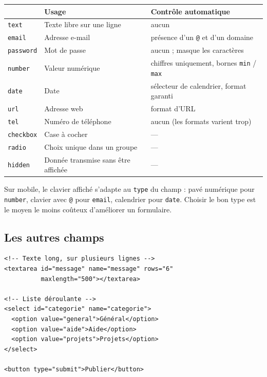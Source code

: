 \documentclass[a4paper,11pt]{article}
\newcommand{\hdr}[1]{\multicolumn{1}{l}{\color{white}\bfseries #1}}
\renewcommand{\arraystretch}{1.3}
\begin{document}
\begin{center}
\renewcommand{\arraystretch}{1.0}
\begin{tabularx}{\linewidth}{p{2.5cm}Xp{3.5cm}}
  \toprule
  \rowcolor{uniNavy}
  \hdr{\texttt{type}} & \hdr{Usage} & \hdr{Contrôle automatique} \\
  \midrule
  \rowcolor{uniPaper}
  \texttt{text} & Texte libre sur une ligne & aucun \\
  \texttt{email} & Adresse e-mail & présence d'un \texttt{@} et d'un domaine \\
  \rowcolor{uniPaper}
  \texttt{password} & Mot de passe & aucun ; masque les caractères \\
  \texttt{number} & Valeur numérique & chiffres uniquement, bornes \texttt{min} / \texttt{max} \\
  \rowcolor{uniPaper}
  \texttt{date} & Date & sélecteur de calendrier, format garanti \\
  \texttt{url} & Adresse web & format d'URL \\
  \rowcolor{uniPaper}
  \texttt{tel} & Numéro de téléphone & aucun (les formats varient trop) \\
  \texttt{checkbox} & Case à cocher & --- \\
  \rowcolor{uniPaper}
  \texttt{radio} & Choix unique dans un groupe & --- \\
  \texttt{hidden} & Donnée transmise sans être affichée & --- \\
  \bottomrule
\end{tabularx}
\end{center}

\begin{tcolorbox}[astuce, title={Le bon \texttt{type} améliore surtout le téléphone}]
Sur mobile, le clavier affiché s'adapte au \texttt{type} du champ : pavé numérique pour \texttt{number}, clavier avec \texttt{@} pour \texttt{email}, calendrier pour \texttt{date}. Choisir le bon type est le moyen le moins coûteux d'améliorer un formulaire.
\end{tcolorbox}

\subsection{Les autres champs}

\begin{lstlisting}[language=HTML5, caption={Zone de texte, liste déroulante et bouton}]
<!-- Texte long, sur plusieurs lignes -->
<textarea id="message" name="message" rows="6"
          maxlength="500"></textarea>

<!-- Liste déroulante -->
<select id="categorie" name="categorie">
  <option value="general">Général</option>
  <option value="aide">Aide</option>
  <option value="projets">Projets</option>
</select>

<button type="submit">Publier</button>
\end{lstlisting}
\end{document}
